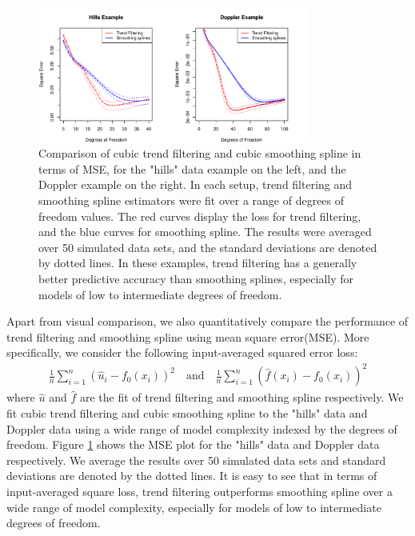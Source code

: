 \documentclass[a4paper]{article}
\begin{document}
\begin{figure}[t]
\centering
\includegraphics[width = 0.8\textwidth]{Figures/Figure6.pdf}
\caption{Comparison of cubic trend filtering and cubic smoothing spline in terms of MSE, for the "hills" data example on the left, and the Doppler example on the right. In each setup, trend filtering and smoothing spline estimators were fit over a range of degrees of freedom values. The red curves display the loss for trend filtering, and the blue curves for smoothing spline. The results were averaged over 50 simulated data sets, and the standard deviations are denoted by dotted lines. In these examples, trend filtering has a generally better predictive accuracy than smoothing splines, especially for models of low to intermediate degrees of freedom.}
\label{fig:Figure6_mse}
\end{figure}

Apart from visual comparison, we also quantitatively compare the performance of trend filtering and smoothing spline using mean square error(MSE). More specifically, we consider the following input-averaged squared error loss:
\begin{align}
\frac{1}{n}\sum_{i=1}^n (\hat{u}_i - f_0(x_i))^2 \quad \text{and}\quad \frac{1}{n}\sum_{i=1}^n (\hat{f}(x_i) - f_0(x_i))^2
\label{eq:avg_squareloss}
\end{align}
where $\hat{u}$ and $\hat{f}$ are the fit of trend filtering and smoothing spline respectively. We fit cubic trend filtering and cubic smoothing spline to the "hills" data and Doppler data using a wide range of model complexity indexed by the degrees of freedom. Figure \ref{fig:Figure6_mse} shows the MSE plot for the "hills" data and Doppler data respectively. We average the results over 50 simulated data sets and standard deviations are denoted by the dotted lines. It is easy to see that in terms of input-averaged square loss, trend filtering outperforms smoothing spline over a wide range of model complexity, especially for models of low to intermediate degrees of freedom. 
\end{document}
